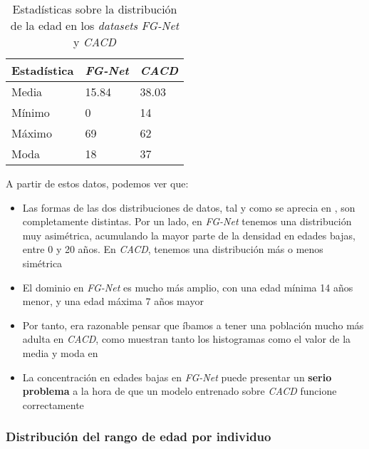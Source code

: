 \begin{table}[H]
\centering
\begin{tabular}{|l|l|l|}
    \hline
    \textbf{Estadística} & \textbf{\textit{FG-Net}} & \textbf{\textit{CACD}} \\
    \hline

    Media  & 15.84 & 38.03 \\
    Mínimo & 0     & 14    \\
    Máximo & 69    & 62    \\
    Moda   & 18    & 37    \\

    \hline

\end{tabular}
    \caption{Estadísticas sobre la distribución de la edad en los \textit{datasets} \textit{FG-Net} y \textit{CACD}}
    \label{table:conjunta_fgnet_cacd_estadisticas_edad}
\end{table}

A partir de estos datos, podemos ver que:

\begin{itemize}
    \item Las formas de las dos distribuciones de datos, tal y como se aprecia en , son completamente distintas. Por un lado, en \textit{FG-Net} tenemos una distribución muy asimétrica, acumulando la mayor parte de la densidad en edades bajas, entre 0 y 20 años. En \textit{CACD}, tenemos una distribución más o menos simétrica
    \item El dominio en \textit{FG-Net} es mucho más amplio, con una edad mínima 14 años menor, y una edad máxima 7 años mayor
    \item Por tanto, era razonable pensar que íbamos a tener una población mucho más adulta en \textit{CACD}, como muestran tanto los histogramas como el valor de la media y moda en 
    \item La concentración en edades bajas en \textit{FG-Net} puede presentar un \textbf{serio problema} a la hora de que un modelo entrenado sobre \textit{CACD} funcione correctamente
\end{itemize}


\subsubsection{Distribución del rango de edad por individuo}

